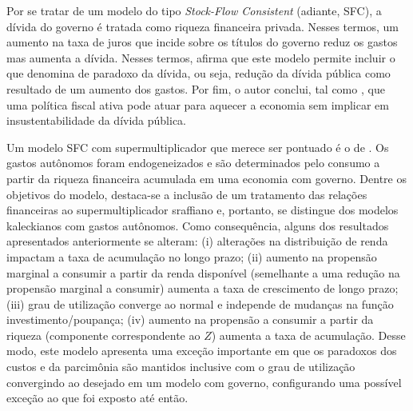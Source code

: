 Por se tratar de um modelo do tipo \textit{Stock-Flow Consistent} (adiante, SFC), a dívida do governo é tratada como riqueza financeira privada. Nesses termos, um aumento na taxa de juros que incide sobre os títulos do governo reduz os gastos mas aumenta a dívida. Nesses termos, \textcite{hein_autonomous_2018} afirma que este modelo permite incluir o que denomina de paradoxo da dívida, ou seja, redução da dívida pública como resultado de um aumento dos gastos. Por fim, o autor conclui, tal como \textcite{arestis_effectiveness_2012}, que uma política fiscal ativa pode atuar para aquecer a economia sem implicar em insustentabilidade da dívida pública.

Um modelo SFC com supermultiplicador que merece ser pontuado é o de \textcite{brochier_supermultiplier_2018}. Os gastos autônomos foram endogeneizados e são determinados pelo consumo a partir da riqueza financeira acumulada em uma economia com governo. Dentre os objetivos do modelo, destaca-se a inclusão de um tratamento das relações financeiras ao supermultiplicador sraffiano e, portanto, se distingue dos modelos kaleckianos com gastos autônomos. Como consequência, alguns dos resultados apresentados anteriormente se alteram: (i) alterações na distribuição de renda impactam a taxa de acumulação no longo prazo; (ii) aumento na propensão marginal a consumir a partir da renda disponível (semelhante a uma redução na propensão marginal a consumir) aumenta a taxa de crescimento de longo prazo; (iii) grau de utilização converge ao normal e independe de mudanças na função investimento/poupança; (iv) aumento na propensão a consumir a partir da riqueza (componente correspondente ao $Z$) aumenta a taxa de acumulação. Desse modo, este modelo apresenta uma exceção importante em que os paradoxos dos custos e da parcimônia são mantidos inclusive com o grau de utilização convergindo ao desejado em um modelo com governo, configurando uma possível exceção ao que foi exposto até então.



